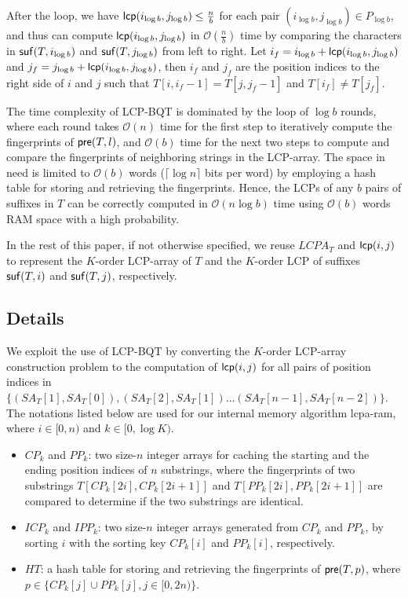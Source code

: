 \documentclass{llncs}
\begin{document}
After the loop, we have ${\sf lcp}(i_{\log b},j_{\log b}) \le \frac{n}{b}$ for each pair $(i_{\log b},j_{\log b}) \in P_{\log b}$, and thus can compute ${\sf lcp}(i_{\log b}, j_{\log b})$ in $\mathcal{O}(\frac{n}{b})$ time by comparing the characters in ${\sf suf}(T,i_{\log b})$ and ${\sf suf}(T,j_{\log b})$ from left to right. Let $i_{f} = i_{\log b} + {\sf lcp}(i_{\log b}, j_{\log b})$ and $j_{f}= j_{\log b} + {\sf lcp}(i_{\log b}, j_{\log b})$, then $i_{f}$ and $j_{f}$ are the position indices to the right side of $i$ and $j$ such that $T[i,i_{f}-1] = T[j,j_{f}-1]$ and $T[i_{f}] \neq T[j_{f}]$.

The time complexity of LCP-BQT is dominated by the loop of $\log b$ rounds, where each round takes $\mathcal{O}(n)$ time for the first step to iteratively compute the fingerprints of ${\sf pre}(T,l)$, and $\mathcal{O}(b)$ time for the next two steps to compute and compare the fingerprints of neighboring strings in the LCP-array. The space in need is limited to $\mathcal{O}(b)$ words ($\lceil \log n\rceil$ bits per word) by employing a hash table for storing and retrieving the fingerprints. Hence, the LCPs of any $b$ pairs of suffixes in $T$ can be correctly computed in $\mathcal{O}(n\log b)$ time using $\mathcal{O}(b)$ words RAM space with a high probability.

In the rest of this paper, if not otherwise specified, we reuse $LCPA_T$ and ${\sf lcp}(i,j)$ to represent the $K$-order LCP-array of $T$ and the $K$-order LCP of suffixes ${\sf suf}(T,i)$ and ${\sf suf}(T,j)$, respectively.
\subsection{Details}\label{subsec:implementation_in_ram}

We exploit the use of LCP-BQT by converting the $K$-order LCP-array construction problem to the computation of ${\sf lcp}(i,j)$ for all pairs of position indices in $\{(SA_T[1], SA_T[0]),(SA_T[2], SA_T[1])\ldots (SA_T[n-1], SA_T[n-2])\}$. The notations listed below are used for our internal memory algorithm lcpa-ram, where $i\in [0,n)$ and $k\in [0,\log K)$.

\begin{itemize}
\item $CP_k$ and $PP_k$: two size-$n$ integer arrays for caching the starting and the ending position indices of  $n$ substrings, where the fingerprints of two substrings $T[CP_k[2i],CP_k[2i+1]]$ and $T[PP_k[2i],PP_k[2i+1]]$ are compared to determine if the two substrings are identical.
\item $ICP_k$ and $IPP_k$: two size-$n$ integer arrays generated from $CP_k$ and $PP_k$, by sorting $i$ with the sorting key $CP_k[i]$ and $PP_k[i]$, respectively.
\item $HT$: a hash table for storing and retrieving the fingerprints of ${\sf pre}(T,p)$, where $p\in \{CP_k[j] \cup PP_k[j], j\in[0,2n)\}$.
\end{itemize}
\end{document}
